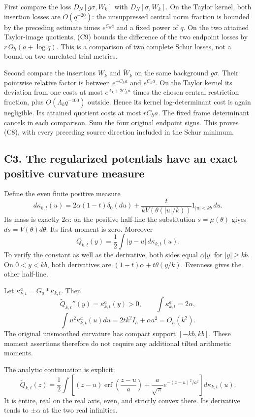 First compare the loss \(D_N[g\sigma,W_k]\) with \(D_N[\sigma,W_k]\). On
the Taylor kernel, both insertion losses are \(O(q^{-20})\): the
unsuppressed central norm fraction is bounded by the preceding estimate
times \(e^{C_ha}\) and a fixed power of \(q\). On the two attained
Taylor-image quotients, (C9) bounds the difference of the two endpoint
losses by \(r\,O_h(a+\log q)\). This is a comparison of two complete
Schur losses, not a bound on two unrelated trial metrics.

Second compare the insertions \(W_k\) and \(\widetilde W_k\) on the same
background \(g\sigma\). Their pointwise relative factor is between
\(e^{-C_ha}\) and \(e^{C_ha}\). On the Taylor kernel its deviation from
one costs at most \(e^{\Lambda_k+2C_ha}\) times the chosen central
restriction fraction, plus \(O(\Lambda_kq^{-100})\) outside. Hence its
kernel log-determinant cost is again negligible. Its attained quotient
costs at most \(rC_ha\). The fixed frame determinant cancels in each
comparison. Sum the four original endpoint signs. This proves (C8), with
every preceding source direction included in the Schur minimum.

\subsection{C3. The regularized potentials have an exact positive
curvature
measure}\label{sa:c3.-the-regularized-potentials-have-an-exact-positive-curvature-measure}

Define the even finite positive measure \[
d\kappa_{k,t}(u)=2\alpha(1-t)\delta_0(du)
+\frac{t}{kV(\theta(|u|/k))}1_{|u|<kb}\,du.
\tag{C11}
\] Its mass is exactly \(2\alpha\): on the positive half-line the
substitution \(s=\mu(\theta)\) gives \(ds=V(\theta)d\theta\). Its first
moment is zero. Moreover \[
\boxed{Q_{k,t}(y)=\frac12\int|y-u|\,d\kappa_{k,t}(u).}\tag{C12}
\] To verify the constant as well as the derivative, both sides equal
\(\alpha|y|\) for \(|y|\ge kb\). On \(0<y<kb\), both derivatives are
\((1-t)\alpha+t\theta(y/k)\). Evenness gives the other half-line.

Let \(\kappa^a_{k,t}=G_a*\kappa_{k,t}\). Then \[
\widetilde Q_{k,t}''(y)=\kappa^a_{k,t}(y)>0,
\qquad \int\kappa^a_{k,t}=2\alpha,
\] \[
\int u^2\kappa^a_{k,t}(u)du=2tk^2I_h+\alpha a^2=O_h(k^2).
\tag{C13}
\] The original unsmoothed curvature has compact support \([-kb,kb]\).
These moment assertions therefore do not require any additional tilted
arithmetic moments.

The analytic continuation is explicit: \[
\widetilde Q_{k,t}(z)=\frac12\int
\left[(z-u)\operatorname{erf}\!\left(\frac{z-u}{a}\right)
+\frac a{\sqrt\pi}e^{-(z-u)^2/a^2}\right]d\kappa_{k,t}(u).
\tag{C14}
\] It is entire, real on the real axis, even, and strictly convex there.
Its derivative tends to \(\pm\alpha\) at the two real infinities.

